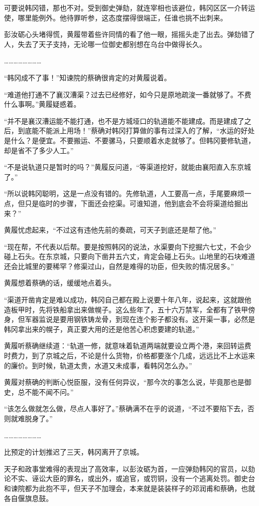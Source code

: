 可要说韩冈错，那也不对。受到御史弹劾，就连宰相也该避位，韩冈区区一介转运使，哪里能例外。他待罪听参，这态度摆得很端正，任谁也挑不出刺来。

彭汝砺心头堵得慌，黄履带着些许同情的看了他一眼，摇摇头走了出去。弹劾错了人，失去了天子支持，无论哪一位御史都别想在乌台中做得长久。

……………………

“韩冈成不了事！”知谏院的蔡确很肯定的对黄履说着。

“难道他打通不了襄汉漕渠？过去已经修好，如今只是原地疏浚一番就够了。不费什么事啊。”黄履疑惑着。

“并不是襄汉漕运能不能打通，也不是方城垭口的轨道能不能建成。而是建成了之后，到底能不能派上用场！”蔡确对韩冈打算做的事有过深入的了解，“水运的好处是什么？是便宜。不要搬运、不要骡马，只要顺着水走就够了。但韩冈要修轨道，却是省不了多少人工。”

“不是说轨道只是暂时的吗？”黄履反问道，“等渠道挖好，就能由襄阳直入东京城了。”

“所以说韩冈聪明，这是一点没有错的。先修轨道，人工要高一点，手尾要麻烦一点，但只是临时的步骤，下面还会挖渠。可谁知道，他到底会不会将渠道给掘出来？”

黄履忧虑起来，“不过这有违他先前的奏疏，可天子到底还是帮了他。”

“现在帮，不代表以后帮。要是按照韩冈的说法，水渠要向下挖掘六七丈，不会少碰上石头。在东京城，只要向下凿井五六丈，肯定会碰上石头。山地里的石块难道还会比城里的要稀罕？修渠过山，自然是难得的功臣，但失败的情况居多。”

黄履想着蔡确的话，缓缓地点着头。

“渠道开凿肯定是难以成功，韩冈自己都在殿上说要十年八年，说起来，这就跟他造板甲时，先将铁船拿出来做幌子。这么些年了，五十六万禁军，全都有了铁甲傍身，但军器监说是要用钢铁铸龙骨，到现在连个影子都没有。这开渠一事，必然是韩冈拿出来的幌子，真正要大用的还是他苦心积虑要建的轨道。”

黄履听蔡确继续道：“轨道一修，就意味着轨道两端就要设立两个港，来回转运费时费力，到了京城之后，不论是什么货物，价格都要涨个几成，远远比不上水运来的廉价。到时候，轨道太贵，水道又未成事，看韩冈怎么办。”

黄履对蔡确的判断心悦臣服，没有任何异议，“那今次的事怎么说，毕竟那也是御史，总不能不闻不问。”

“该怎么做就怎么做，尽点人事好了。”蔡确满不在乎的说道，“不过不要陷下去，否则就难脱身了。”

……………………

比预定的计划推迟了三天，韩冈离开了京城。

天子和政事堂难得的表现出了高效率，以彭汝砺为首，一应弹劾韩冈的官员，以劾论不实、诬讼大臣的罪名，或出外，或追官，或罚铜，没有一个逃离处罚。御史台和谏院都为此抱不平，但天子不加理会，本来就是装装样子的邓润甫和蔡确，也就各自偃旗息鼓。

